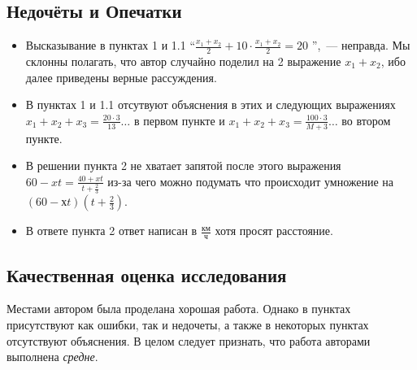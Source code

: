 \documentclass[12pt,twoside]{article}
\begin{document}
\subsection*{Недочёты и Опечатки}
\begin{itemize}
\item Высказывание в пунктах 1 и 1.1  ``$\frac{x_1 + x_2}{2} + 10\cdot\frac{x_1 + x_2}{2} = 20$ '',~--- неправда. Мы склонны полагать, что автор случайно поделил на 2 выражение $x_1+x_2$, ибо далее приведены верные рассуждения.
\item В пунктах  1 и 1.1 отсутвуют объяснения в этих и следующих выражениях  $x_1 + x_2 + x_3 = \frac{20\cdot3}{13}\ldots$ в первом пункте и $x_1 + x_2 + x_3 = \frac{100\cdot3}{M+3}\ldots$ во втором пункте.
\item В решении пункта 2 не хватает запятой после этого выражения $60 - xt = \frac{40+xt}{t+\frac{2}{3}}$ из-за чего можно подумать что происходит умножение на $(60-хt)\left(t + \frac{2}{3}\right)$.
\item В ответе пункта 2 ответ написан в $\frac{\text{км}}{\text{ч}}$ хотя просят расстояние.
\end{itemize}

\subsection*{Качественная оценка исследования}
Местами автором была проделана хорошая работа. Однако в пунктах присутствуют как ошибки, так и недочеты, а также в некоторых пунктах отсутствуют объяснения. В целом следует признать, что работа авторами выполнена \textit{средне}.
\end{document}
